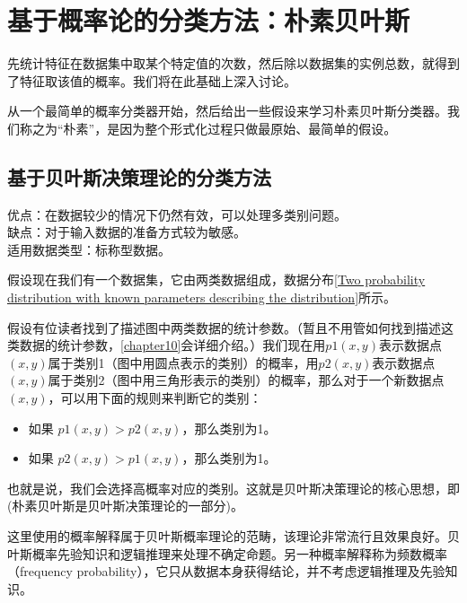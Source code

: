 \chapter{基于概率论的分类方法：朴素贝叶斯\label{chapter04}}
先统计特征在数据集中取某个特定值的次数，然后除以数据集的实例总数，就得到了特征取该值的概率。我们将在此基础上深入讨论。

从一个最简单的概率分类器开始，然后给出一些假设来学习朴素贝叶斯分类器。我们称之为“朴素”，是因为整个形式化过程只做最原始、最简单的假设。
\section{基于贝叶斯决策理论的分类方法\label{4.1}}
\begin{tcolorbox}[title=朴素贝叶斯]
    优点：在数据较少的情况下仍然有效，可以处理多类别问题。\\
    缺点：对于输入数据的准备方式较为敏感。\\
    适用数据类型：标称型数据。
\end{tcolorbox}



假设现在我们有一个数据集，它由两类数据组成，数据分布\autoref{Two probability distribution with known parameters describing the distribution}所示。

假设有位读者找到了描述图中两类数据的统计参数。（暂且不用管如何找到描述这类数据的统计参数，\autoref{chapter10}会详细介绍。）我们现在用$p1(x,y)$表示数据点$(x,y)$属于类别1（图中用圆点表示的类别）的概率，用$p2(x,y)$表示数据点$(x,y)$属于类别2（图中用三角形表示的类别）的概率，那么对于一个新数据点$(x,y)$，可以用下面的规则来判断它的类别：
\begin{itemize}
    \item 如果 $p1(x,y) > p2(x,y)$，那么类别为1。
    \item 如果 $p2(x,y) > p1(x,y)$，那么类别为1。
\end{itemize}
也就是说，我们会选择高概率对应的类别。这就是贝叶斯决策理论的核心思想，即(朴素贝叶斯是贝叶斯决策理论的一部分)。

\begin{tcolorbox}[title=贝叶斯？]
    这里使用的概率解释属于贝叶斯概率理论的范畴，该理论非常流行且效果良好。贝叶斯概率先验知识和逻辑推理来处理不确定命题。另一种概率解释称为频数概率（frequency probability），它只从数据本身获得结论，并不考虑逻辑推理及先验知识。
\end{tcolorbox}

